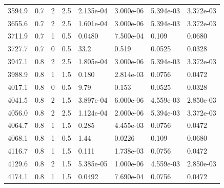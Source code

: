 \documentclass[preview]{standalone}
\begin{document}
{{{\begin{tabular}{L{1.2cm}C{1.2cm} C{0.3cm}C{0.5cm} C{1.4cm}C{1.4cm} C{1.4cm}C{1.4cm}}
  3594.9  &   0.7  & 2     & 2.5 &  2.135e-04  & 3.000e-06  & 5.394e-03 &  3.372e-03   \\ 
  3655.6  &   0.7  & 2     & 2.5 &  1.601e-04  & 3.000e-06  & 5.394e-03 &  3.372e-03   \\ 
  3711.9  &   0.7  & 1     & 0.5 &  0.0480  & 7.500e-04  & 0.109 &  0.0680   \\ 
  3727.7  &   0.7  & 0     & 0.5 &  33.2  & 0.519  & 0.0525 &  0.0328   \\ 
  3947.1  &   0.8  & 2     & 2.5 &  1.805e-04  & 3.000e-06  & 5.394e-03 &  3.372e-03   \\ 
  3988.9  &   0.8  & 1     & 1.5 &  0.180  & 2.814e-03  & 0.0756 &  0.0472   \\ 
  4017.1  &   0.8  & 0     & 0.5 &  9.79  & 0.153  & 0.0525 &  0.0328   \\ 
  4041.5  &   0.8  & 2     & 1.5 &  3.897e-04  & 6.000e-06  & 4.559e-03 &  2.850e-03   \\ 
  4056.0  &   0.8  & 2     & 2.5 &  1.124e-04  & 2.000e-06  & 5.394e-03 &  3.372e-03   \\ 
  4064.7  &   0.8  & 1     & 1.5 &  0.285  & 4.455e-03  & 0.0756 &  0.0472   \\ 
  4068.1  &   0.8  & 1     & 0.5 &  1.44  & 0.0226  & 0.109 &  0.0680   \\ 
  4116.7  &   0.8  & 1     & 1.5 &  0.111  & 1.738e-03  & 0.0756 &  0.0472   \\ 
  4129.6  &   0.8  & 2     & 1.5 &  5.385e-05  & 1.000e-06  & 4.559e-03 &  2.850e-03   \\ 
  4174.1  &   0.8  & 1     & 1.5 &  0.0492  & 7.690e-04  & 0.0756 &  0.0472   \\ 
\hline 
\end{tabular} 

}}}
\end{document}
